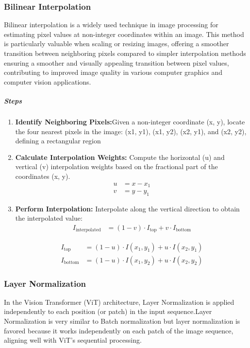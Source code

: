 \subsubsection{Bilinear Interpolation }
Bilinear interpolation is a widely used technique in image processing for estimating pixel values at non-integer coordinates within an image. This method is particularly valuable when scaling or resizing images, offering a smoother transition between neighboring pixels compared to simpler interpolation methods ensuring a smoother and visually appealing transition between pixel values, contributing to improved image quality in various computer graphics and computer vision applications.
\subparagraph{Steps}
\begin{enumerate}
    \item \textbf{Identify Neighboring Pixels:}Given a non-integer coordinate (x, y), locate the four nearest pixels in the image: (x1, y1), (x1, y2), (x2, y1), and (x2, y2), defining a rectangular region

    \item \textbf{Calculate Interpolation Weights:} Compute the horizontal (u) and vertical (v) interpolation weights based on the fractional part of the coordinates (x, y).
          \begin{align}
              u & = x - x_1 \label{eq:u_equation} \\
              v & = y - y_1 \label{eq:v_equation}
          \end{align}


    \item \textbf{Perform Interpolation:} Interpolate along the vertical direction to obtain the interpolated value:
          \begin{align}
              I_{\text{interpolated}} & = (1 - v) \cdot I_{\text{top}} + v \cdot I_{\text{bottom}} \label{eq:interpolated_equation}
          \end{align}


          \begin{align}
              I_{\text{top}}    & = (1 - u) \cdot I(x_1, y_1) + u \cdot I(x_2, y_1) \label{eq:itop_equation}    \\
              I_{\text{bottom}} & = (1 - u) \cdot I(x_1, y_2) + u \cdot I(x_2, y_2) \label{eq:ibottom_equation}
          \end{align}


\end{enumerate}
\subsubsection{Layer Normalization}
In the Vision Transformer (ViT) architecture, Layer Normalization is applied independently to each position (or patch) in the input sequence.Layer Normalization is very similar to Batch normalization but layer normalization is favored because it works independently on each patch of the image sequence, aligning well with ViT's sequential processing.\\

